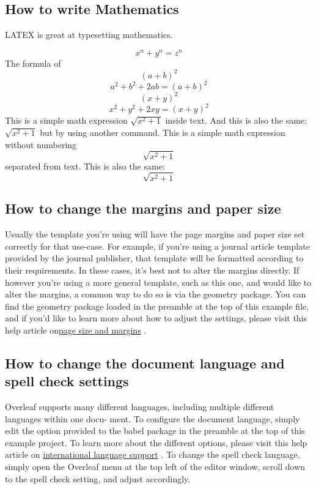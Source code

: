 \documentclass{article}
\begin{document}
\subsection{How to write Mathematics}
LATEX is great at typesetting mathematics.

\[ x^n + y^n = z^n \]
The formula of \[(a+b)^2\]
\begin{equation}
a^2+b^2+2ab=(a+b)^2
\end{equation}
\[(x+y)^2\]
\begin{equation}
x^2+y^2+2xy=(x+y)^2
\end{equation}
This is a simple math expression \(\sqrt{x^2+1}\) inside text.
And this is also the same:
\begin{math}
\sqrt{x^2+1}
\end{math}
but by using another command.
This is a simple math expression without numbering
\[\sqrt{x^2+1}\]
separated from text.
This is also the same:
\begin{displaymath}
\sqrt{x^2+1}
\end{displaymath}

\subsection{How to change the margins and paper size}
Usually the template you’re using will have the page margins and paper size set correctly for that
use-case. For example, if you’re using a journal article template provided by the journal publisher,
that template will be formatted according to their requirements. In these cases, it’s best not to alter
the margins directly.
If however you’re using a more general template, such as this one, and would like to alter the
margins, a common way to do so is via the geometry package. You can find the geometry package
loaded in the preamble at the top of this example file, and if you’d like to learn more about how to
adjust the settings, please visit this help article on\href{www.#.com}{page size and margins} .
\subsection{How to change the document language and spell check settings}
Overleaf supports many different languages, including multiple different languages within one docu-
ment.
To configure the document language, simply edit the option provided to the babel package in the
preamble at the top of this example project. To learn more about the different options, please visit 
this help article on \href{www.#.com}{international language support} .
To change the spell check language, simply open the Overleaf menu at the top left of the editor
window, scroll down to the spell check setting, and adjust accordingly.
\end{document}
